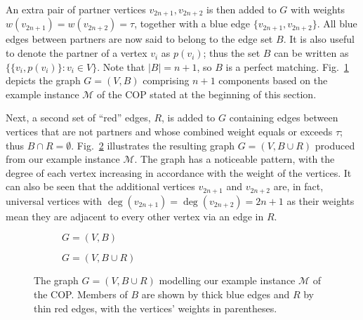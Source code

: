 \documentclass[a4paper,11pt,authoryear]{elsarticle}
\begin{document}
An extra pair of partner vertices $v_{2n+1}, v_{2n+2}$ is then added to $G$ with weights $w(v_{2n+1}) = w(v_{2n+2}) = \tau$, together with a blue edge $\{v_{2n+1}, v_{2n+2}\}$. All blue edges between partners are now said to belong to the edge set $B$. It is also useful to denote the partner of a vertex $v_i$ as $p(v_i)$; thus the set $B$ can be written as $\{\{v_i, p(v_i)\} : v_i \in V\}$. Note that $|B| = n+1$, so $B$ is a perfect matching. Fig.~\ref{fig:partners} depicts the graph $G=(V, B)$ comprising $n+1$ components based on the example instance $\mathcal{M}$ of the COP stated at the beginning of this section. 


Next, a second set of ``red'' edges, $R$, is added to $G$ containing edges between vertices that are not partners and whose combined weight equals or exceeds $\tau$; thus $B \cap R = \emptyset$. Fig.~\ref{fig:threshold1} illustrates the resulting graph $G = (V, B \cup R)$ produced from our example instance $\mathcal{M}$. The graph has a noticeable pattern, with the degree of each vertex increasing in accordance with the weight of the vertices. It can also be seen that the additional vertices $v_{2n+1}$ and $v_{2n+2}$ are, in fact, universal vertices with $\deg(v_{2n+1}) = \deg(v_{2n+2}) = 2n+1$ as their weights mean they are adjacent to every other vertex via an edge in $R$.


\begin{figure}[h!]	
	\centering
	\begin{subfigure}[b]{0.4\textwidth}
		
		\caption{$G = (V, B)$}
		\label{fig:partners}
	\end{subfigure} \hspace{5mm}
	\begin{subfigure}[b]{0.4\textwidth}
		
		\caption{$G = (V, B \cup R)$}
		\label{fig:threshold1}
	\end{subfigure} %
	\caption{The graph $G=(V, B \cup R)$ modelling our example instance $\mathcal{M}$ of the COP. Members of $B$ are shown by thick blue edges and $R$ by thin red edges, with the vertices' weights in parentheses.}
	\label{fig:model}
\end{figure}
\end{document}
